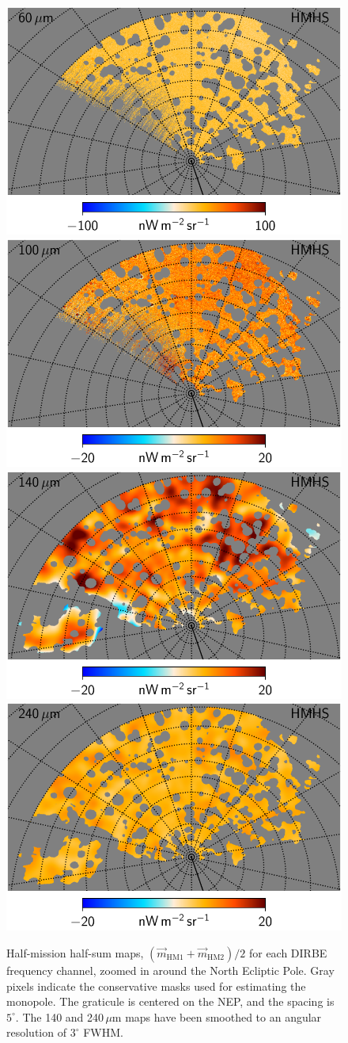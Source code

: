 \documentclass{aa}
\newcommand{\m}[0]{\vec{m}}
\begin{document}
\begin{figure}
  \includegraphics[width=0.376\linewidth]{figs/CGDR2_07_hmhs_fullres_v4.pdf}\hspace*{5mm}
  \includegraphics[width=0.376\linewidth]{figs/CGDR2_08_hmhs_fullres_v4.pdf}\\
  \includegraphics[width=0.376\linewidth]{figs/CGDR2_09_hmhs_fullres_3deg_v4.pdf}\hspace*{5mm}
  \includegraphics[width=0.376\linewidth]{figs/CGDR2_10_hmhs_fullres_3deg_v4.pdf}
  \caption{Half-mission half-sum maps, $(\m_{\mathrm{HM1}}+\m_{\mathrm{HM2}})/2$ for each DIRBE frequency channel, zoomed in around the North Ecliptic Pole. Gray pixels indicate the conservative masks used for estimating the monopole. The graticule is centered on the NEP, and the spacing is $5^{\circ}$. The 140 and 240\,$\mu\mathrm{m}$ maps have been smoothed to an angular resolution of $3^{\circ}$ FWHM.} 
  \label{fig:hmhs_zoom}
\end{figure}
\end{document}
